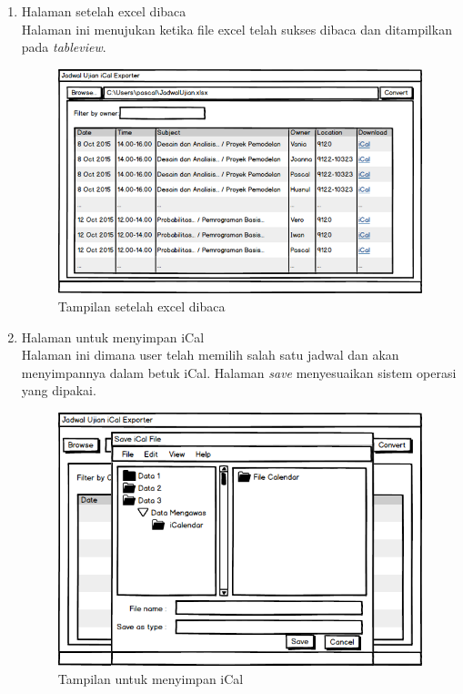 \begin{enumerate}
	\item Halaman setelah excel dibaca\\
	Halaman ini menujukan ketika file excel telah sukses dibaca dan ditampilkan pada \textit{tableview}.
		\begin{figure}[H]
		\centering
		\includegraphics[scale=0.5]{Gambar/antarmuka2}
		\caption{Tampilan setelah excel dibaca}
		\label{fig:excel_dibaca}
		\end{figure}
	\item Halaman untuk menyimpan iCal\\
	Halaman ini dimana user telah memilih salah satu jadwal dan akan menyimpannya dalam betuk iCal. Halaman \textit{save} menyesuaikan sistem operasi yang dipakai. 
		\begin{figure}[H]
		\centering
		\includegraphics[scale=0.5]{Gambar/antarmuka4}
		\caption{Tampilan untuk menyimpan iCal}
		\label{fig:jadwalpng}
		\end{figure}
\end{enumerate}

